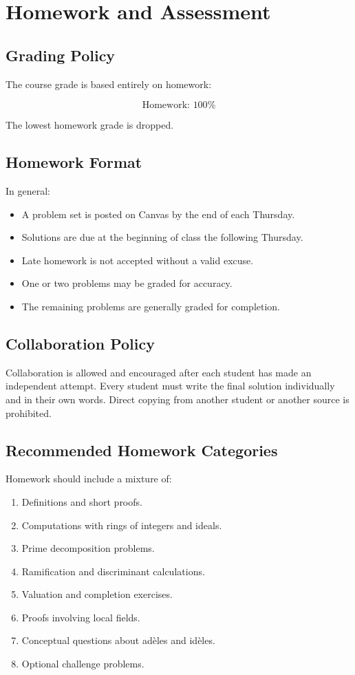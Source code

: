 \documentclass[11pt]{article}
\begin{document}
\section{Homework and Assessment}

\subsection{Grading Policy}

The course grade is based entirely on homework:

\[
    \boxed{\text{Homework: }100\%}
\]

The lowest homework grade is dropped.

\subsection{Homework Format}

In general:

\begin{itemize}
    \item A problem set is posted on Canvas by the end of each Thursday.
    \item Solutions are due at the beginning of class the following Thursday.
    \item Late homework is not accepted without a valid excuse.
    \item One or two problems may be graded for accuracy.
    \item The remaining problems are generally graded for completion.
\end{itemize}

\subsection{Collaboration Policy}

Collaboration is allowed and encouraged after each student has made an
independent attempt. Every student must write the final solution individually
and in their own words. Direct copying from another student or another source
is prohibited.

\subsection{Recommended Homework Categories}

Homework should include a mixture of:

\begin{enumerate}
    \item Definitions and short proofs.
    \item Computations with rings of integers and ideals.
    \item Prime decomposition problems.
    \item Ramification and discriminant calculations.
    \item Valuation and completion exercises.
    \item Proofs involving local fields.
    \item Conceptual questions about adèles and idèles.
    \item Optional challenge problems.
\end{enumerate}
\end{document}
